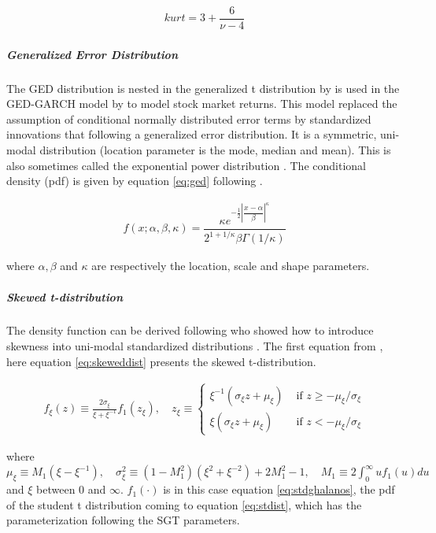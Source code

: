 \documentclass[a4paper, twoside]{templates/ociamthesis}
\begin{document}
\begin{align}
kurt = 3 + \dfrac{6}{\nu-4}
 \label{eq:kurt}
\end{align}

\hypertarget{generalized-error-distribution}{%
\subparagraph{Generalized Error Distribution}\label{generalized-error-distribution}}

\noindent The GED distribution is nested in the generalized t distribution by \textcite{mcdonald1988} is used in the GED-GARCH model by \textcite{nelson1991} to model stock market returns. This model replaced the assumption of conditional normally distributed error terms by standardized innovations that following a generalized error distribution. It is a symmetric, uni-modal distribution (location parameter is the mode, median and mean). This is also sometimes called the exponential power distribution \autocite{bollerslev2008}. The conditional density (pdf) is given by equation \eqref{eq:ged} following \textcite{ghalanos2020}.

\begin{align}
f(x; \alpha, \beta, \kappa) = \dfrac{\kappa e^{-\frac{1}{2}\left|\dfrac{x-\alpha}{\beta}\right|^\kappa}}{2^{1+1/\kappa}\beta\Gamma(1/\kappa)}
 \label{eq:ged}
\end{align}

where \(\alpha, \beta\) and \(\kappa\) are respectively the location, scale and shape parameters.

\hypertarget{skewed-t-distribution}{%
\subparagraph{Skewed t-distribution}\label{skewed-t-distribution}}

\noindent The density function can be derived following \textcite{fernández1998} who showed how to introduce skewness into uni-modal standardized distributions \autocite{trottier2015}. The first equation from \textcite{trottier2015}, here equation \eqref{eq:skeweddist} presents the skewed t-distribution.

\begin{align}
f_{\xi}(z) \equiv \frac{2 \sigma_{\xi}}{\xi+\xi^{-1}} f_{1}\left(z_{\xi}\right), \quad z_{\xi} \equiv\left\{\begin{array}{ll}
\xi^{-1}\left(\sigma_{\xi} z+\mu_{\xi}\right) & \text { if } z \geq-\mu_{\xi} / \sigma_{\xi} \\
\xi\left(\sigma_{\xi} z+\mu_{\xi}\right) & \text { if } z<-\mu_{\xi} / \sigma_{\xi}
\end{array}\right.
 \label{eq:skeweddist}
\end{align}

\noindent where \(\mu_{\xi} \equiv M_{1}\left(\xi-\xi^{-1}\right), \quad \sigma_{\xi}^{2} \equiv\left(1-M_{1}^{2}\right)\left(\xi^{2}+\xi^{-2}\right)+2 M_{1}^{2}-1, \quad M_{1} \equiv 2 \int_{0}^{\infty} u f_{1}(u) d u\) and \(\xi\) between \(0\) and \(\infty\). \(f_1(\cdot)\) is in this case equation \eqref{eq:stdghalanos}, the pdf of the student t distribution coming to equation \eqref{eq:stdist}, which has the parameterization following the SGT parameters.
\end{document}
